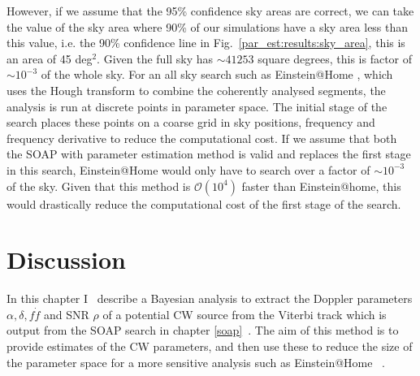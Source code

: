 However, if we assume that the 95\% confidence sky areas are correct, we can
take the value of the sky area where 90\% of our simulations have a sky area
less than this value, i.e. the 90\% confidence line in
Fig.~\ref{par_est:results:sky_area}, this is an area of 45 deg$^2$.  Given the
full sky has $\sim 41253$ square degrees, this is factor of $\sim 10^{-3}$ of
the whole sky.  For an all sky search such as Einstein@Home
\citep{theligoscientificcollaborationandthevirgocollaboration2013EinsteinHome,singh2016ResultsAllsky},
which uses the Hough transform \citep{krishnan2004HoughTransform} to combine
the coherently analysed segments, the analysis is run at discrete points in
parameter space. The initial stage of the search places these points on a
coarse grid in sky positions, frequency and frequency derivative to reduce the
computational cost.  If we assume that both the SOAP with parameter estimation
method is valid and replaces the first stage in this search, Einstein@Home
would only have to search over a factor of $\sim 10^{-3}$ of the sky.  Given
that this method is $\mathcal{O}(10^4)$ faster than Einstein@home, this would
drastically reduce the computational cost of the first stage of the search.
~


%
%
\section{Discussion}
%
%

In this chapter I~ describe a Bayesian
analysis to extract the Doppler parameters $\alpha, \delta, f \dot{f}$ and
\gls{SNR} $\rho$ of a potential \gls{CW} source from the Viterbi track which is
output from the SOAP search in chapter \ref{soap}~. The aim of
this method is to provide estimates of the \gls{CW} parameters, and then use
these to reduce the size of the parameter space for a more sensitive analysis
such as Einstein@Home \citep{singh2016ResultsAllsky}~. 

